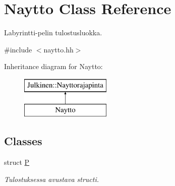 \hypertarget{class_naytto}{}\section{Naytto Class Reference}
\label{class_naytto}


Labyrintti-\/pelin tulostusluokka.  




{\ttfamily \#include $<$naytto.\+hh$>$}

Inheritance diagram for Naytto\+:\begin{figure}[H]
\begin{center}
\leavevmode
\includegraphics[height=2.000000cm]{class_naytto}
\end{center}
\end{figure}
\subsection*{Classes}
\begin{DoxyCompactItemize}
\item 
struct \hyperlink{struct_naytto_1_1_p}{P}
\begin{DoxyCompactList}\small\item\em Tulostuksessa avustava structi. \end{DoxyCompactList}\end{DoxyCompactItemize}

